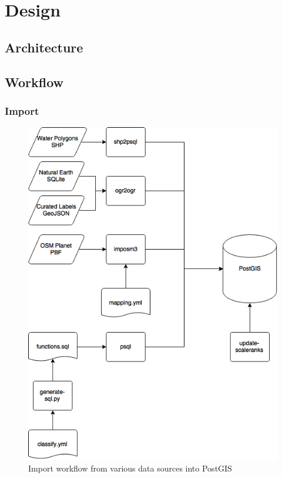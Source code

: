 \chapter{Design}\label{design}


\section{Architecture}\label{architecture}


\section{Workflow}\label{workflow}

\subsection{Import}\label{workflow-import}

\begin{figure}[h]
  \includegraphics[scale=0.6]{images/import_flow.png}
  \caption{Import workflow from various data sources into PostGIS}
\end{figure}

